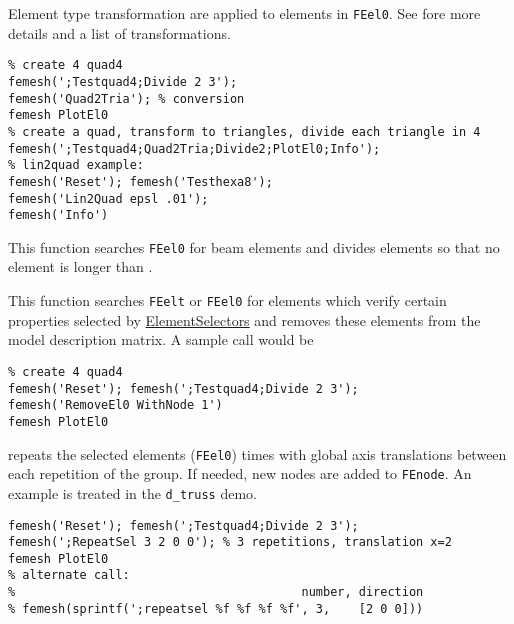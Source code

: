 
Element type transformation are applied to elements in {\tt FEel0}. See  fore more details and a list of transformations.

\begin{verbatim}
% create 4 quad4 
femesh(';Testquad4;Divide 2 3'); 
femesh('Quad2Tria'); % conversion
femesh PlotEl0
% create a quad, transform to triangles, divide each triangle in 4
femesh(';Testquad4;Quad2Tria;Divide2;PlotEl0;Info'); 
% lin2quad example:
femesh('Reset'); femesh('Testhexa8');
femesh('Lin2Quad epsl .01');
femesh('Info')
\end{verbatim}%


 This function searches {\tt FEel0} for beam elements and divides elements so that no element is longer than .


 This function searches {\tt FEelt} or {\tt FEel0} for elements which verify certain properties selected by \hyperlink{findelt}{{\ti ElementSelectors}} and removes these elements from the model description matrix. A sample call would be

\begin{verbatim}
% create 4 quad4 
femesh('Reset'); femesh(';Testquad4;Divide 2 3'); 
femesh('RemoveEl0 WithNode 1')
femesh PlotEl0
\end{verbatim}%



  repeats the selected elements ({\tt FEel0})  times with global axis translations  between each repetition of the group. If needed, new nodes are added to {\tt FEnode}. An example is treated in the {\tt d\_truss} demo. 

\begin{verbatim}
femesh('Reset'); femesh(';Testquad4;Divide 2 3'); 
femesh(';RepeatSel 3 2 0 0'); % 3 repetitions, translation x=2
femesh PlotEl0
% alternate call:
%                                        number, direction
% femesh(sprintf(';repeatsel %f %f %f %f', 3,    [2 0 0]))
\end{verbatim}%


